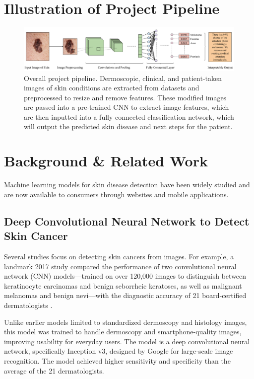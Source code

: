 \documentclass{article} %
\begin{document}
\clearpage

\section{Illustration of Project Pipeline}

\begin{figure}[!h]
\begin{center}
\includegraphics[width=1.0\textwidth]{Figs/project_pipeline.png}
\end{center}
\caption{Overall project pipeline. Dermoscopic, clinical, and patient-taken images of skin conditions are extracted from datasets and preprocessed to resize and remove features. These modified images are passed into a pre-trained CNN to extract image features, which are then inputted into a fully connected classification network, which will output the predicted skin disease and next steps for the patient.}
\end{figure}


\section{Background \& Related Work}
\label{sec:background}

Machine learning models for skin disease detection have been widely studied and are now available to consumers through websites and mobile applications.

\subsection{Deep Convolutional Neural Network to Detect Skin Cancer}

Several studies focus on detecting skin cancers from images. For example, a landmark 2017 study compared the performance of two convolutional neural network (CNN) models—trained on over 120,000 images to distinguish between keratinocyte carcinomas and benign seborrheic keratoses, as well as malignant melanomas and benign nevi—with the diagnostic accuracy of 21 board-certified dermatologists \citep{esteva2017dermatologist}.

Unlike earlier models limited to standardized dermoscopy and histology images, this model was trained to handle dermoscopy and smartphone-quality images, improving usability for everyday users. The model is a deep convolutional neural network, specifically Inception v3, designed by Google for large-scale image recognition. The model achieved higher sensitivity and specificity than the average of the 21 dermatologists.
\end{document}
